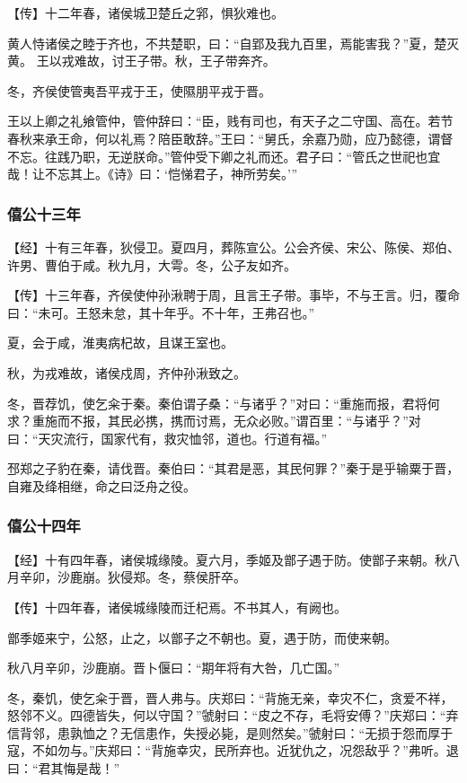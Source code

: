 \documentclass[]{article}
\begin{document}
【传】十二年春，诸侯城卫楚丘之郛，惧狄难也。

黄人恃诸侯之睦于齐也，不共楚职，曰：``自郢及我九百里，焉能害我？''夏，楚灭黄。
王以戎难故，讨王子带。秋，王子带奔齐。

冬，齐侯使管夷吾平戎于王，使隰朋平戎于晋。

王以上卿之礼飨管仲，管仲辞曰：``臣，贱有司也，有天子之二守国、高在。若节春秋来承王命，何以礼焉？陪臣敢辞。''王曰：``舅氏，余嘉乃勋，应乃懿德，谓督不忘。往践乃职，无逆朕命。''管仲受下卿之礼而还。君子曰：``管氏之世祀也宜哉！让不忘其上。《诗》曰：`恺悌君子，神所劳矣。'''

\hypertarget{header-n779}{%
\subsubsection{僖公十三年}\label{header-n779}}

【经】十有三年春，狄侵卫。夏四月，葬陈宣公。公会齐侯、宋公、陈侯、郑伯、许男、曹伯于咸。秋九月，大雩。冬，公子友如齐。

【传】十三年春，齐侯使仲孙湫聘于周，且言王子带。事毕，不与王言。归，覆命曰：``未可。王怒未怠，其十年乎。不十年，王弗召也。''

夏，会于咸，淮夷病杞故，且谋王室也。

秋，为戎难故，诸侯戍周，齐仲孙湫致之。

冬，晋荐饥，使乞籴于秦。秦伯谓子桑：``与诸乎？''对曰：``重施而报，君将何求？重施而不报，其民必携，携而讨焉，无众必败。''谓百里：``与诸乎？''对曰：``天灾流行，国家代有，救灾恤邻，道也。行道有福。''

邳郑之子豹在秦，请伐晋。秦伯曰：``其君是恶，其民何罪？''秦于是乎输粟于晋，自雍及绛相继，命之曰泛舟之役。

\hypertarget{header-n788}{%
\subsubsection{僖公十四年}\label{header-n788}}

【经】十有四年春，诸侯城缘陵。夏六月，季姬及鄫子遇于防。使鄫子来朝。秋八月辛卯，沙鹿崩。狄侵郑。冬，蔡侯肝卒。

【传】十四年春，诸侯城缘陵而迁杞焉。不书其人，有阙也。

鄫季姬来宁，公怒，止之，以鄫子之不朝也。夏，遇于防，而使来朝。

秋八月辛卯，沙鹿崩。晋卜偃曰：``期年将有大咎，几亡国。''

冬，秦饥，使乞籴于晋，晋人弗与。庆郑曰：``背施无亲，幸灾不仁，贪爱不祥，怒邻不义。四德皆失，何以守国？''虢射曰：``皮之不存，毛将安傅？''庆郑曰：``弃信背邻，患孰恤之？无信患作，失授必毙，是则然矣。''虢射曰：``无损于怨而厚于寇，不如勿与。''庆郑曰：``背施幸灾，民所弃也。近犹仇之，况怨敌乎？''弗听。退曰：``君其悔是哉！''
\end{document}

